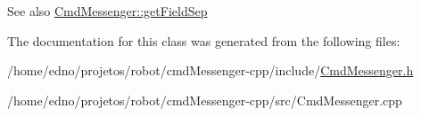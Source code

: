 \begin{DoxySeeAlso}{See also}
\hyperlink{class_cmd_messenger_ad2b0dd8eb93b7529df56acf73482ebd3}{Cmd\+Messenger\+::get\+Field\+Sep} 
\end{DoxySeeAlso}


The documentation for this class was generated from the following files\+:\begin{DoxyCompactItemize}
\item 
/home/edno/projetos/robot/cmd\+Messenger-\/cpp/include/\hyperlink{_cmd_messenger_8h}{Cmd\+Messenger.\+h}\item 
/home/edno/projetos/robot/cmd\+Messenger-\/cpp/src/Cmd\+Messenger.\+cpp\end{DoxyCompactItemize}
